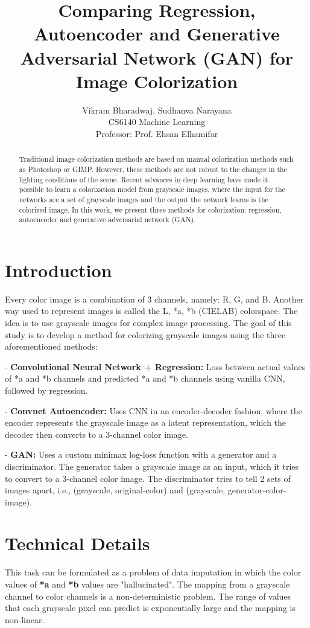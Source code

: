 \documentclass{article}
\title{Comparing Regression, Autoencoder and Generative
Adversarial Network (GAN) for Image Colorization}
\author{Vikram Bharadwaj, Sudhanva Narayana \\ 
        CS6140 Machine Learning \\
        Professor: Prof. Ehsan Elhamifar \\}
\begin{document}
\maketitle

\begin{abstract}
Traditional image colorization methods are based on manual colorization methods such as Photoshop or GIMP.
However, these methods are not robust to the changes in the lighting conditions of the scene.
Recent advances in deep learning have made it possible to learn a colorization model from grayscale images, where the input for the networks are a set of grayscale images and the output the network learns is the colorized image. 
In this work, we present three methods for colorization: regression, autoencoder and generative adversarial network (GAN).
\end{abstract}

\section{Introduction}
Every color image is a combination of 3 channels, namely: R, G, and B. 
Another way used to represent images is called the L, *a, *b (CIELAB) colorspace.
The idea is to use grayscale images for complex image processing. 
The goal of this study is to develop a method for colorizing grayscale images using the three aforementioned methods:

- \textbf{Convolutional Neural Network + Regression:} Loss between actual values of *a and *b channels and predicted *a and *b channels using vanilla CNN, followed by regression.

- \textbf{Convnet Autoencoder:} Uses CNN in an encoder-decoder fashion, where the encoder represents the grayscale image as a latent representation, which the decoder then converts to a 3-channel color image.

- \textbf{GAN:}  Uses a custom minimax log-loss function with a generator and a discriminator. The generator takes a grayscale image as an input, which it tries to convert to a 3-channel color image. The discriminator tries to tell 2 sets of images apart, i.e., (grayscale, original-color) and (grayscale, generator-color-image).

\section{Technical Details}
This task can be formulated as a problem of data imputation in which the color values of \textbf{*a} and \textbf{*b} values are "hallucinated".
The mapping from a grayscale channel to color channels is a non-deterministic problem. 
The range of values that each grayscale pixel can predict is exponentially large and the mapping is non-linear. 
\end{document}

